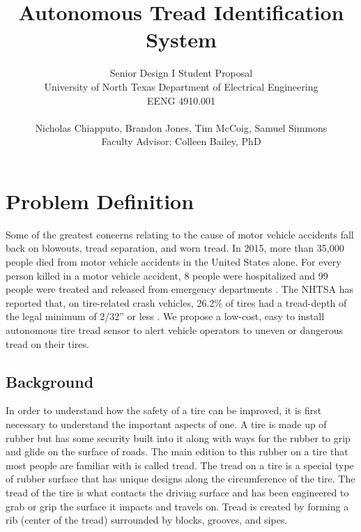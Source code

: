 \documentclass[11pt]{IEEEtran}
\begin{document}
	\title{ Autonomous Tread Identification System }

	\author{	Senior Design I Student Proposal \\
				University of North Texas Department of Electrical Engineering \\
				EENG 4910.001 \\ \\
				Nicholas Chiapputo, Brandon Jones, Tim McCoig, Samuel Simmons \\
				Faculty Advisor: Colleen Bailey, PhD
	}

	\maketitle


	\section{Problem Definition}
		Some of the greatest concerns relating to the cause of motor vehicle accidents fall back on blowouts, tread separation, and worn tread. In 2015, more than 35,000 people died from motor vehicle accidents in the United States alone. For every person killed in a motor vehicle accident, 8 people were hospitalized and 99 people were treated and released from emergency departments \cite{cdcKeyStats}. The NHTSA has reported that, on tire-related crash vehicles, 26.2\% of tires had a tread-depth of the legal minimum of 2/32'' or less \cite[pp.~8-9]{nhtsaCrashStats}. We propose a low-cost, easy to install autonomous tire tread sensor to alert vehicle operators to uneven or dangerous tread on their tires.

		\subsection{Background}
			In order to understand how the safety of a tire can be improved, it is first necessary to understand the important aspects of one. A tire is made up of rubber but has some security built into it along with ways for the rubber to grip and glide on the surface of roads. The main edition to this rubber on a tire that most people are familiar with is called tread. The tread on a tire is a special type of rubber surface that has unique designs along the circumference of the tire. The tread of the tire is what contacts the driving surface and has been engineered to grab or grip the surface it impacts and travels on. Tread is created by forming a rib (center of the tread) surrounded by blocks, grooves, and sipes.
\end{document}
